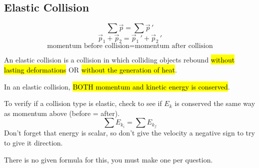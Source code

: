 \documentclass[a4paper,12pt]{article}
\begin{document}
\subsection{Elastic Collision}
$$\sum\vec{p} = \sum\vec{p}\,'$$
$$\vec{p}_1 + \vec{p}_2 = \vec{p}_1\,\!' + \vec{p}_2\,\!'$$
$$\textrm{momentum before collision} = \textrm{momentum after collision}$$

An elastic collision is a collision in which colliding objects rebound \hl{without lasting deformations} OR \hl{without the generation of heat}.

In an elastic collision, \hl{BOTH momentum and kinetic energy is conserved}.

To verify if a collision type is elastic, check to see if $E_k$ is conserved the same way as momentum above (before = after).
$$\sum E_{k_i} = \sum E_{k_f}$$
Don't forget that energy is scalar, so don't give the velocity a negative sign to try to give it direction.

There is no given formula for this, you must make one per question.
\end{document}
